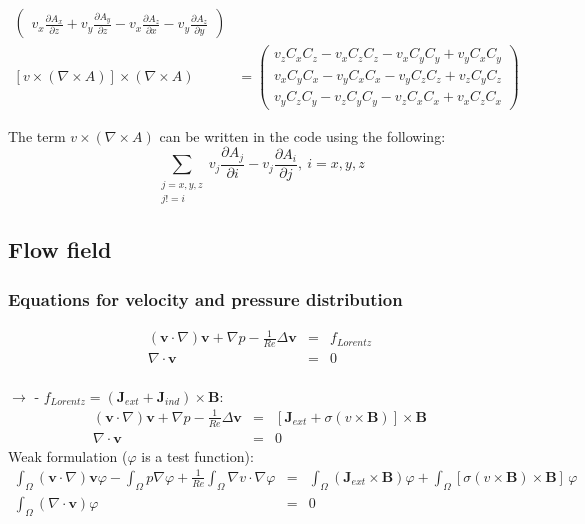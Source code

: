\documentclass[smallextended]{svjour3}       %
\begin{document}
\begin{align}
\begin{pmatrix}
					v_x \frac{\partial A_x}{\partial z} + v_y \frac{\partial A_y}{\partial z}
					- v_x \frac{\partial A_z}{\partial x} - v_y \frac{\partial A_z}{\partial y}
         \end{pmatrix}\\
				\left[v \times \left( \nabla \times A \right)\right] \times \left( \nabla \times A \right) & = \begin{pmatrix}
           v_z C_x C_z - v_x C_z C_z - v_x C_y C_y + v_y C_x C_y\\
					 v_x C_y C_x - v_y C_x C_x - v_y C_z C_z + v_z C_y C_z\\
					 v_y C_z C_y - v_z C_y C_y - v_z C_x C_x + v_x C_z C_x
         \end{pmatrix}
   \end{align}
	
		The term $v \times \left( \nabla \times A \right)$ can be written in the code using the following:
		$$\sum_{\substack{j = x, y, z \\ j != i}} v_j \frac{\partial A_j}{\partial i} - v_j \frac{\partial A_i}{\partial j},\ i = x, y, z$$
		\subsection{Flow field}
		\subsubsection{Equations for velocity and pressure distribution}
		\begin{eqnarray}
			\left(\mathbf{v} \cdot \nabla\right)\mathbf{v} + \nabla p - \frac{1}{Re} \Delta \mathbf{v} & = & f_{Lorentz}\\
			\nabla \cdot \mathbf{v} & = & 0
		\end{eqnarray}\ \\
		$\rightarrow$ - $f_{Lorentz} = \left(\mathbf{J}_{ext} + \mathbf{J}_{ind}\right) \times \mathbf{B}$:
		\ \\
		\begin{eqnarray}
			\left(\mathbf{v} \cdot \nabla\right)\mathbf{v} + \nabla p - \frac{1}{Re} \Delta \mathbf{v} & = & \left[\mathbf{J}_{ext} + \sigma \left(v \times \mathbf{B}\right)\right] \times \mathbf{B}\\
			\nabla \cdot \mathbf{v} & = & 0
		\end{eqnarray}
		Weak formulation  ($\varphi$ is a test function):
		\begin{eqnarray}
			\int_{\Omega} \left(\mathbf{v} \cdot \nabla\right)\mathbf{v} \varphi
			- \int_{\Omega} p \nabla \varphi
			+ \frac{1}{Re} \int_{\Omega} \nabla v \cdot \nabla \varphi
			& = &
			\int_{\Omega} \left(\mathbf{J}_{ext} \times \mathbf{B}\right) \varphi
			+ \int_{\Omega} \left[\sigma \left(v \times \mathbf{B}\right) \times \mathbf{B}\right]\, \varphi
			\\
			\int_{\Omega} \left(\nabla \cdot \mathbf{v}\right) \varphi & = & 0
		\end{eqnarray}
				
\end{document}
